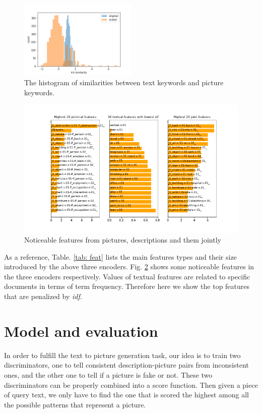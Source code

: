\documentclass{article} %
\begin{document}
\begin{figure}[htbp]
	\centering
	\includegraphics[width=0.5\textwidth]{../results/cross-simi}
	\caption{The histogram of similarities between text keywords and picture keywords.}
	\label{fig: cross-simi}
\end{figure}

\begin{figure}[htbp]
  	\centering
	\includegraphics[width=\linewidth]{../results/feat_val}
	\caption{Noticeable features from pictures, descriptions and them jointly}
	\label{fig: feat-val}
\end{figure}

As a reference, Table. \ref{tab: feat} lists the main features types and their size introduced by the above three encoders. Fig. \ref{fig: feat-val} shows some noticeable features in the three encoders respectively. Values of textual features are related to specific documents in terms of term frequency. Therefore here we show the top features that are penalized by \emph{idf}.

\section{Model and evaluation}
In order to fulfill the text to picture generation task, our idea is to train two discriminators, one to tell consistent description-picture pairs from inconsistent ones, and the other one to tell if a picture is fake or not. These two discriminators can be properly combined into a score function. Then given a piece of query text, we only have to find the one that is scored the highest among all the possible patterns that represent a picture.
\end{document}
